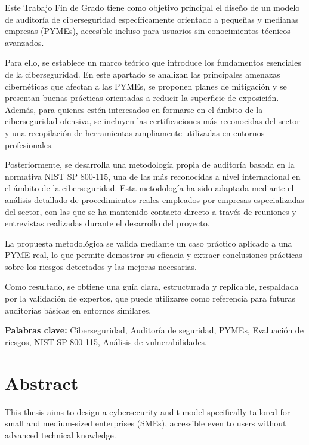 \documentclass[a4paper, 11pt]{article}
\begin{document}
Este Trabajo Fin de Grado tiene como objetivo principal el diseño de un modelo de auditoría de ciberseguridad específicamente orientado a pequeñas y medianas empresas (PYMEs), accesible incluso para usuarios sin conocimientos técnicos avanzados.

Para ello, se establece un marco teórico que introduce los fundamentos esenciales de la ciberseguridad. En este apartado se analizan las principales amenazas cibernéticas que afectan a las PYMEs, se proponen planes de mitigación y se presentan buenas prácticas orientadas a reducir la superficie de exposición. Además, para quienes estén interesados en formarse en el ámbito de la ciberseguridad ofensiva, se incluyen las certificaciones más reconocidas del sector y una recopilación de herramientas ampliamente utilizadas en entornos profesionales.

Posteriormente, se desarrolla una metodología propia de auditoría basada en la normativa NIST SP 800-115, una de las más reconocidas a nivel internacional en el ámbito de la ciberseguridad. Esta metodología ha sido adaptada mediante el análisis detallado de procedimientos reales empleados por empresas especializadas del sector, con las que se ha mantenido contacto directo a través de reuniones y entrevistas realizadas durante el desarrollo del proyecto.

La propuesta metodológica se valida mediante un caso práctico aplicado a una PYME real, lo que permite demostrar su eficacia y extraer conclusiones prácticas sobre los riesgos detectados y las mejoras necesarias.

Como resultado, se obtiene una guía clara, estructurada y replicable, respaldada por la validación de expertos, que puede utilizarse como referencia para futuras auditorías básicas en entornos similares.

\textbf{Palabras clave:} Ciberseguridad, Auditoría de seguridad, PYMEs, Evaluación de riesgos, NIST SP 800-115, Análisis de vulnerabilidades.
\clearpage

\thispagestyle{nohead}

\section*{Abstract}
This thesis aims to design a cybersecurity audit model specifically tailored for small and medium-sized enterprises (SMEs), accessible even to users without advanced technical knowledge.
\end{document}
